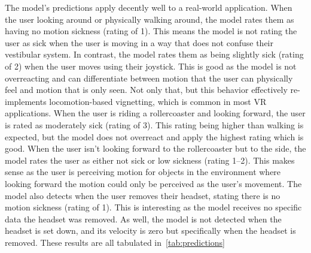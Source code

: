 The model's predictions apply decently well to a real-world application.
When the user looking around or physically walking around, the model rates them as having no motion sickness (rating of 1).
This means the model is not rating the user as sick when the user is moving in a way that does not confuse their vestibular system.
In contrast, the model rates them as being slightly sick (rating of 2) when the user moves using their joystick.
This is good as the model is not overreacting and can differentiate between motion that the user can physically feel and motion that is only seen.
Not only that, but this behavior effectively re-implements locomotion-based vignetting, which is common in most VR applications.
When the user is riding a rollercoaster and looking forward, the user is rated as moderately sick (rating of 3).
This rating being higher than walking is expected, but the model does not overreact and apply the highest rating which is good.
When the user isn't looking forward to the rollercoaster but to the side, the model rates the user as either not sick or low sickness (rating 1--2).
This makes sense as the user is perceiving motion for objects in the environment where looking forward the motion could only be perceived as the user's movement.
The model also detects when the user removes their headset, stating there is no motion sickness (rating of 1).
This is interesting as the model receives no specific data the headset was removed.
As well, the model is not detected when the headset is set down, and its velocity is zero but specifically when the headset is removed.
These results are all tabulated in~\ref{tab:predictions}

